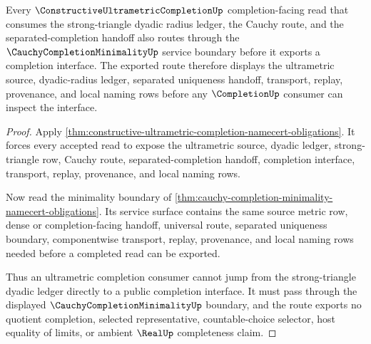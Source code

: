 \begin{theorem}
\label{thm:constructive-ultrametric-completion-minimality-handoff}
Every $\ConstructiveUltrametricCompletionUp$ completion-facing read that consumes the strong-triangle dyadic radius ledger, the Cauchy route, and the separated-completion handoff also routes through the $\CauchyCompletionMinimalityUp$ service boundary before it exports a completion interface. The exported route therefore displays the ultrametric source, dyadic-radius ledger, separated uniqueness handoff, transport, replay, provenance, and local naming rows before any $\CompletionUp$ consumer can inspect the interface.
\end{theorem}
\begin{proof}
Apply \autoref{thm:constructive-ultrametric-completion-namecert-obligations}. It forces every accepted read to expose the ultrametric source, dyadic ledger, strong-triangle row, Cauchy route, separated-completion handoff, completion interface, transport, replay, provenance, and local naming rows.

Now read the minimality boundary of \autoref{thm:cauchy-completion-minimality-namecert-obligations}. Its service surface contains the same source metric row, dense or completion-facing handoff, universal route, separated uniqueness boundary, componentwise transport, replay, provenance, and local naming rows needed before a completed read can be exported.

Thus an ultrametric completion consumer cannot jump from the strong-triangle dyadic ledger directly to a public completion interface. It must pass through the displayed $\CauchyCompletionMinimalityUp$ boundary, and the route exports no quotient completion, selected representative, countable-choice selector, host equality of limits, or ambient $\RealUp$ completeness claim.
\end{proof}
